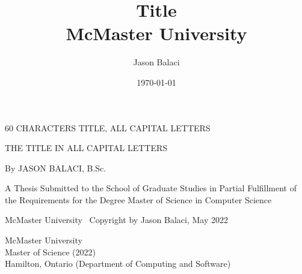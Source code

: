 \documentclass[12pt,oneside]{book}
\title{
    {Title}\\
    {McMaster University}
}
\author{Jason Balaci}
\date{\today}
\begin{document}
\frontmatter

\todototoc
\listoftodos


\newpage



\null %
\vspace{0.25\textheight}

\begin{center}
  60 CHARACTERS TITLE, ALL CAPITAL LETTERS
\end{center}

\newpage


\null
\vspace{0.2\textheight}

\begin{center}
  THE TITLE IN ALL CAPITAL LETTERS

  \vspace{2cm}

  By JASON BALACI, B.Sc.

  \vfill

  A Thesis Submitted to the School of Graduate Studies in Partial Fulfillment of the Requirements for the Degree Master of Science in Computer Science

  \vspace{2cm}

  McMaster University \textcopyright\ Copyright by Jason Balaci, May 2022

\end{center}

\newpage


\setcounter{page}{2} %

\noindent
McMaster University \\
Master of Science (2022) \\
Hamilton, Ontario (Department of Computing and Software)
\end{document}
